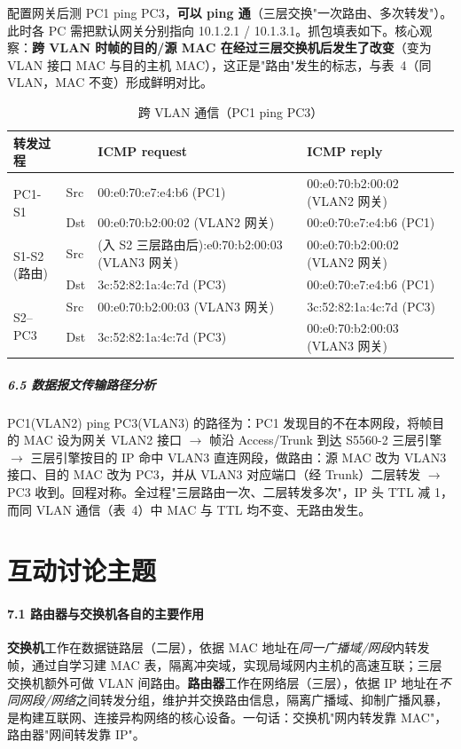 \documentclass[12pt,a4paper]{article}
\begin{document}
\noindent 配置网关后测 PC1 ping PC3，\textbf{可以 ping 通}（三层交换"一次路由、多次转发"）。此时各 PC 需把默认网关分别指向 10.1.2.1 / 10.1.3.1。抓包填表如下。核心观察：\textbf{跨 VLAN 时帧的目的/源 MAC 在经过三层交换机后发生了改变}（变为 VLAN 接口 MAC 与目的主机 MAC），这正是"路由"发生的标志，与表~4（同 VLAN，MAC 不变）形成鲜明对比。

\begin{table}[H]
\centering
\caption{跨 VLAN 通信（PC1 ping PC3）}
\begin{tabular}{p{1.7cm}p{1.0cm}p{5.2cm}p{5.2cm}}
\toprule
转发过程 & & \textbf{ICMP request} & \textbf{ICMP reply} \\
\midrule
\multirow{2}{*}{PC1-S1}
 & Src & 00:e0:70:e7:e4:b6 (PC1) & 00:e0:70:b2:00:02 (VLAN2 网关) \\
 & Dst & 00:e0:70:b2:00:02 (VLAN2 网关) & 00:e0:70:e7:e4:b6 (PC1) \\
\midrule
\multirow{2}{*}{\parbox{1.7cm}{S1-S2\\(路由)}}
 & Src & (入 S2 三层路由后)\newline 00:e0:70:b2:00:03 (VLAN3 网关) & 00:e0:70:b2:00:02 (VLAN2 网关) \\
 & Dst & 3c:52:82:1a:4c:7d (PC3) & 00:e0:70:e7:e4:b6 (PC1) \\
\midrule
\multirow{2}{*}{S2--PC3}
 & Src & 00:e0:70:b2:00:03 (VLAN3 网关) & 3c:52:82:1a:4c:7d (PC3) \\
 & Dst & 3c:52:82:1a:4c:7d (PC3) & 00:e0:70:b2:00:03 (VLAN3 网关) \\
\bottomrule
\end{tabular}
\end{table}

\subparagraph{6.5 数据报文传输路径分析}
PC1(VLAN2) ping PC3(VLAN3) 的路径为：PC1 发现目的不在本网段，将帧目的 MAC 设为网关 VLAN2 接口 $\to$ 帧沿 Access/Trunk 到达 S5560-2 三层引擎 $\to$ 三层引擎按目的 IP 命中 VLAN3 直连网段，做路由：源 MAC 改为 VLAN3 接口、目的 MAC 改为 PC3，并从 VLAN3 对应端口（经 Trunk）二层转发 $\to$ PC3 收到。回程对称。全过程"三层路由一次、二层转发多次"，IP 头 TTL 减 1，而同 VLAN 通信（表~4）中 MAC 与 TTL 均不变、无路由发生。

\section{互动讨论主题}

\paragraph{7.1 路由器与交换机各自的主要作用}
\textbf{交换机}工作在数据链路层（二层），依据 MAC 地址在\emph{同一广播域/网段}内转发帧，通过自学习建 MAC 表，隔离冲突域，实现局域网内主机的高速互联；三层交换机额外可做 VLAN 间路由。\textbf{路由器}工作在网络层（三层），依据 IP 地址在\emph{不同网段/网络}之间转发分组，维护并交换路由信息，隔离广播域、抑制广播风暴，是构建互联网、连接异构网络的核心设备。一句话：交换机"网内转发靠 MAC"，路由器"网间转发靠 IP"。
\end{document}
